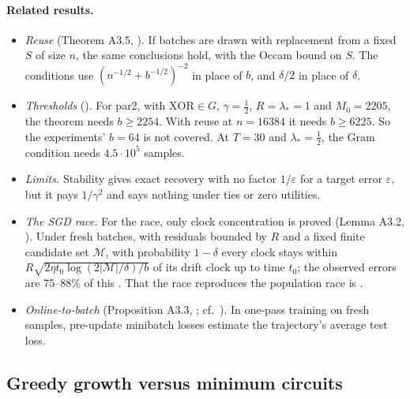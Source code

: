 \paragraph{Related results.}
\begin{itemize}[nosep]
\item \emph{Reuse} (Theorem A3.5, ). If batches are drawn with replacement from a fixed $S$ of size $n$, the same conclusions hold, with the Occam bound on $S$. The conditions use $(n^{-1/2}+b^{-1/2})^{-2}$ in place of $b$, and $\delta/2$ in place of $\delta$.
\item \emph{Thresholds} (). For par2, with $\mathrm{XOR}\in G$, $\gamma=\frac12$, $R=\lambda_*=1$ and $M_0=2205$, the theorem needs $b\ge2254$. With reuse at $n=16384$ it needs $b\ge6225$. So the experiments' $b=64$ is not covered. At $T=30$ and $\lambda_*=\frac12$, the Gram condition needs $4.5\cdot10^5$ samples.
\item \emph{Limits.} Stability gives exact recovery with no factor $1/\varepsilon$ for a target error $\varepsilon$, but it pays $1/\gamma^2$ and says nothing under ties or zero utilities.
\item \emph{The SGD race.} For the race, only clock concentration is proved (Lemma A3.2, ). Under fresh batches, with residuals bounded by $R$ and a fixed finite candidate set $\mathcal M$, with probability $1-\delta$ every clock stays within $R\sqrt{2\eta t_0\log(2|\mathcal M|/\delta)/b}$ of its drift clock up to time $t_0$; the observed errors are 75--88\% of this . That the race reproduces the population race is .
\item \emph{Online-to-batch} (Proposition A3.3, ; cf.~\cite{cesabianchi2004online}). In one-pass training on fresh samples, pre-update minibatch losses estimate the trajectory's average test loss.
\end{itemize}

\subsection{Greedy growth versus minimum circuits}\label{app:discrete:greedy}

